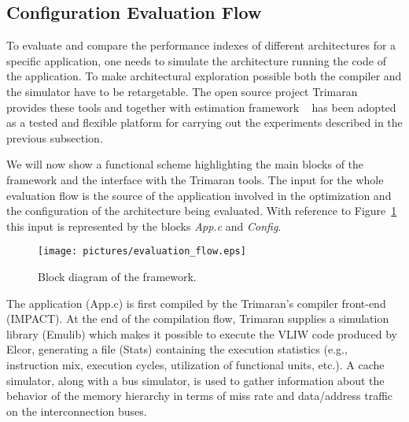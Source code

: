 \begin{table}
\end{table}
\subsection{Configuration Evaluation Flow}

To evaluate and compare the performance indexes of different
architectures for a specific application, one needs to simulate the
architecture running the code of the application. To make
architectural exploration possible both the compiler and the simulator
have to be retargetable. The open source project Trimaran~\cite{trimaran_hp} provides these
tools and together with estimation framework \ee~\cite{palpatti_estimedia03} has been
adopted as a tested and flexible platform for carrying out the
experiments described in the previous subsection.

We will now show a functional scheme highlighting the main blocks of
the \ee{} framework and the interface with the Trimaran tools. The
input for the whole evaluation flow is the source of the application
involved in the optimization and the configuration of the architecture
being evaluated.  With reference to Figure~\ref{fig:evaluation_flow}
this input is represented by the blocks \emph{App.c} and
\emph{Config}.
\begin{figure}
        \centering
        \texttt{[image: pictures/evaluation\_flow.eps]}
        \caption{Block diagram of the framework.}
        \label{fig:evaluation_flow}
\end{figure}

The application (App.c) is first compiled by the Trimaran's compiler
front-end (IMPACT). At the end of the compilation flow,
Trimaran supplies a simulation library (Emulib) which makes it
possible to execute the VLIW code produced by Elcor, generating a file
(Stats) containing the execution statistics (e.g., instruction mix,
execution cycles, utilization of functional units, etc.). A cache
simulator, along with a bus simulator, is used to gather information
about the behavior of the memory hierarchy in terms of miss rate and
data/address traffic on the interconnection buses.

